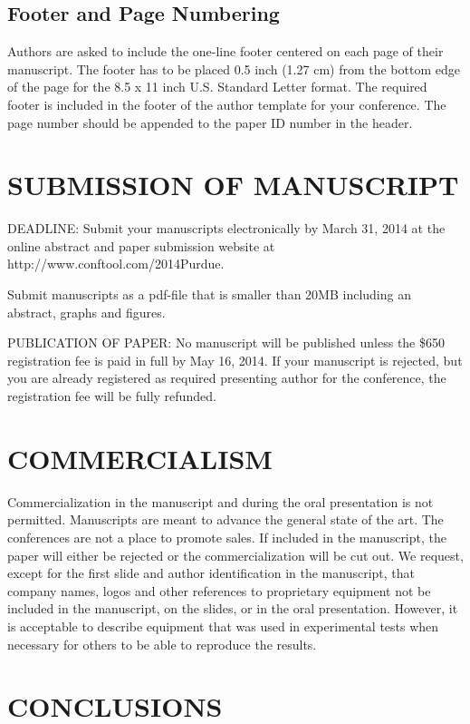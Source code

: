 \documentclass[10pt]{extarticle}
\begin{document}
\subsection{Footer and Page Numbering}
Authors are asked to include the one-line footer centered on each page of their manuscript. The footer has to be placed 0.5 inch (1.27 cm) from the bottom edge of the page for the 8.5 x 11 inch U.S. Standard Letter format.  The required footer is included in the footer of the author template for your conference. The page number should be appended to the paper ID number in the header.


\section{SUBMISSION OF MANUSCRIPT}

DEADLINE: Submit your manuscripts electronically by March 31, 2014 at the online abstract and paper submission website at http://www.conftool.com/2014Purdue. 

Submit manuscripts as a pdf-file that is smaller than 20MB including an abstract, graphs and figures.  


PUBLICATION OF PAPER:  No manuscript will be published unless the \$650 registration fee is paid in full by May 16, 2014.  If your manuscript is rejected, but you are already registered as required presenting author for the conference, the registration fee will be fully refunded.

\section{COMMERCIALISM}

Commercialization in the manuscript and during the oral presentation is not permitted.  Manuscripts are meant to advance the general state of the art.  The conferences are not a place to promote sales.  If included in the manuscript, the paper will either be rejected or the commercialization will be cut out.  We request, except for the first slide and author identification in the manuscript, that company names, logos and other references to proprietary equipment not be included in the manuscript, on the slides, or in the oral presentation.  However, it is acceptable to describe equipment that was used in experimental tests when necessary for others to be able to reproduce the results.

\section{CONCLUSIONS}
\end{document}
